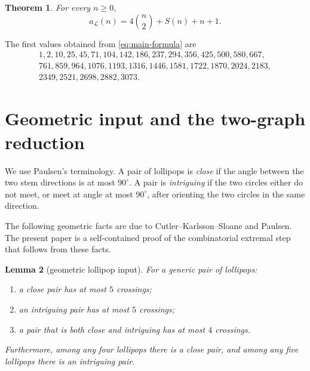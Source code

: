 \documentclass[12pt]{article}
\theoremstyle{plain}
\newtheorem{theorem}{Theorem}
\newtheorem{lemma}[theorem]{Lemma}
\theoremstyle{definition}
\theoremstyle{remark}
\newcommand{\Lop}{\mathcal L}
\begin{document}
\begin{theorem}\label{thm:lollipop-formula}
For every \(n\ge0\),
\begin{equation}\label{eq:main-formula}
  a_{\Lop}(n)=4\binom n2+S(n)+n+1.
\end{equation}
\end{theorem}

The first values obtained from \eqref{eq:main-formula} are
\[
\begin{gathered}
1,2,10,25,45,71,104,142,186,237,294,356,425,500,580,667,\\
761,859,964,1076,1193,1316,1446,1581,1722,1870,2024,2183,\\
2349,2521,2698,2882,3073.
\end{gathered}
\]

\section{Geometric input and the two-graph reduction}

We use Paulsen's terminology.  A pair of lollipops is \emph{close} if the
angle between the two stem directions is at most \(90^\circ\).  A pair is
\emph{intriguing} if the two circles either do not meet, or meet at angle at
most \(90^\circ\), after orienting the two circles in the same direction.

The following geometric facts are due to Cutler--Karlsson--Sloane and Paulsen.
The present paper is a self-contained proof of the combinatorial extremal step
that follows from these facts.

\begin{lemma}[geometric lollipop input]\label{lem:geometry}
For a generic pair of lollipops:
\begin{enumerate}[label=(\roman*)]
  \item a close pair has at most \(5\) crossings;
  \item an intriguing pair has at most \(5\) crossings;
  \item a pair that is both close and intriguing has at most \(4\) crossings.
\end{enumerate}
Furthermore, among any four lollipops there is a close pair, and among any five
lollipops there is an intriguing pair.
\end{lemma}
\end{document}
